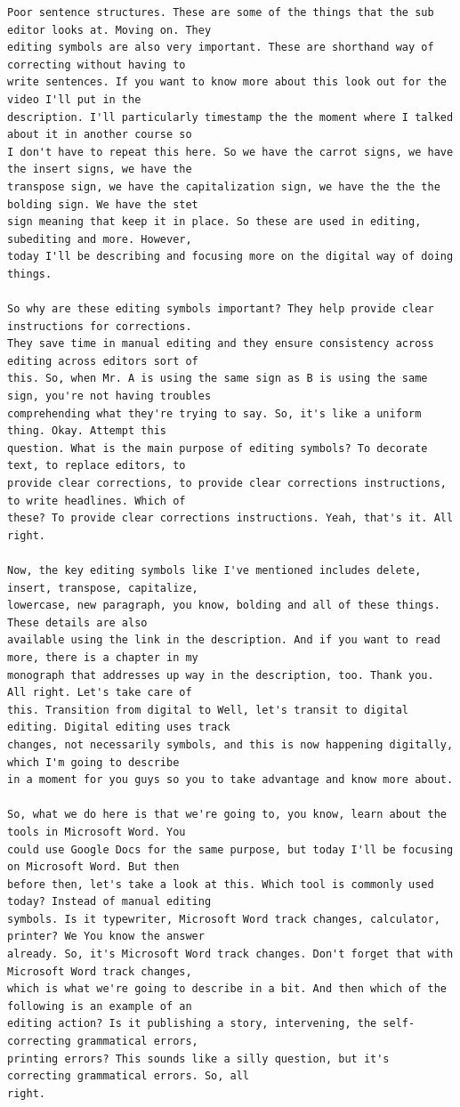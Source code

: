 {\begin{Verbatim}
Poor sentence structures. These are some of the things that the sub editor looks at. Moving on. They
editing symbols are also very important. These are shorthand way of correcting without having to
write sentences. If you want to know more about this look out for the video I'll put in the
description. I'll particularly timestamp the the moment where I talked about it in another course so
I don't have to repeat this here. So we have the carrot signs, we have the insert signs, we have the
transpose sign, we have the capitalization sign, we have the the the bolding sign. We have the stet
sign meaning that keep it in place. So these are used in editing, subediting and more. However,
today I'll be describing and focusing more on the digital way of doing things.

So why are these editing symbols important? They help provide clear instructions for corrections.
They save time in manual editing and they ensure consistency across editing across editors sort of
this. So, when Mr. A is using the same sign as B is using the same sign, you're not having troubles
comprehending what they're trying to say. So, it's like a uniform thing. Okay. Attempt this
question. What is the main purpose of editing symbols? To decorate text, to replace editors, to
provide clear corrections, to provide clear corrections instructions, to write headlines. Which of
these? To provide clear corrections instructions. Yeah, that's it. All right.

Now, the key editing symbols like I've mentioned includes delete, insert, transpose, capitalize,
lowercase, new paragraph, you know, bolding and all of these things. These details are also
available using the link in the description. And if you want to read more, there is a chapter in my
monograph that addresses up way in the description, too. Thank you. All right. Let's take care of
this. Transition from digital to Well, let's transit to digital editing. Digital editing uses track
changes, not necessarily symbols, and this is now happening digitally, which I'm going to describe
in a moment for you guys so you to take advantage and know more about.

So, what we do here is that we're going to, you know, learn about the tools in Microsoft Word. You
could use Google Docs for the same purpose, but today I'll be focusing on Microsoft Word. But then
before then, let's take a look at this. Which tool is commonly used today? Instead of manual editing
symbols. Is it typewriter, Microsoft Word track changes, calculator, printer? We You know the answer
already. So, it's Microsoft Word track changes. Don't forget that with Microsoft Word track changes,
which is what we're going to describe in a bit. And then which of the following is an example of an
editing action? Is it publishing a story, intervening, the self-correcting grammatical errors,
printing errors? This sounds like a silly question, but it's correcting grammatical errors. So, all
right.


\end{Verbatim}}
